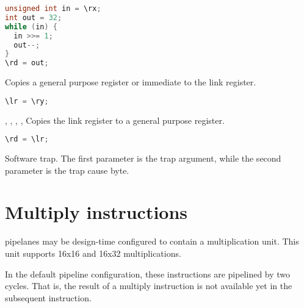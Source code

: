\begin{lstlisting}[numbers=none, basicstyle=\ttfamily\footnotesize, language=C++]
unsigned int in = \rx;
int out = 32;
while (in) {
  in >>= 1;
  out--;
}
\rd = out;
\end{lstlisting}

Copies a general purpose register or immediate to the link register.

\begin{lstlisting}[numbers=none, basicstyle=\ttfamily\footnotesize, language=C++]
\lr = \ry;
\end{lstlisting}

,
,
,
,
Copies the link register to a general purpose register.

\begin{lstlisting}[numbers=none, basicstyle=\ttfamily\footnotesize, language=C++]
\rd = \lr;
\end{lstlisting}

Software trap. The first parameter is the trap argument, while the second
parameter is the trap cause byte.

\section{Multiply instructions}

\rvex{} pipelanes may be design-time configured to contain a multiplication
unit. This unit supports 16x16 and 16x32 multiplications.

In the default pipeline configuration, these instructions are pipelined by
two cycles. That is, the result of a multiply instruction is not available yet
in the subsequent instruction.

